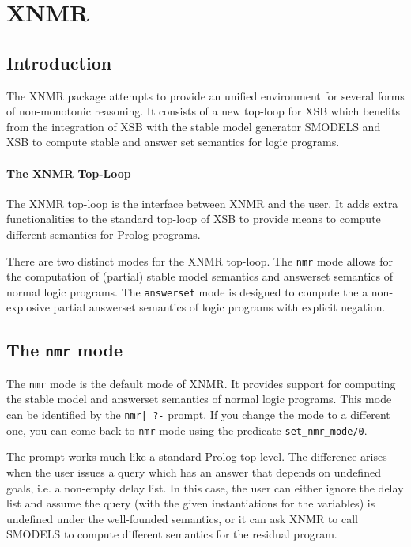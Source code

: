 
\section{XNMR}

\subsection{Introduction}

The XNMR package attempts to provide an unified environment for
several forms of non-monotonic reasoning. It consists of a new
top-loop for XSB which benefits from the integration of XSB with the
stable model generator SMODELS \cite{NiSi97} and XSB to compute
stable and answer set semantics for logic programs.

\paragraph*{The XNMR Top-Loop}

The XNMR top-loop is the interface between XNMR and the user. It adds
extra functionalities to the standard top-loop of XSB to provide means
to compute different semantics  for Prolog programs.

There are two distinct modes for the XNMR top-loop. The \texttt{nmr}
mode allows for the computation of (partial) stable model semantics
and answerset semantics of normal logic programs. The
\texttt{answerset} mode is designed to compute the a non-explosive
partial answerset semantics of logic programs with explicit negation.

\subsection{The \texttt{nmr} mode}

The \texttt{nmr} mode is the default mode of XNMR. It provides support
for computing the stable model and answerset semantics of normal logic
programs. This mode can be identified by the \verb#nmr| ?-# prompt. If
you change the mode to a different one, you can come back to
\texttt{nmr} mode using the predicate \texttt{set\_nmr\_mode/0}.

The prompt works much like a standard Prolog top-level. The difference
arises when the user issues a query which has an answer that depends
on undefined goals, i.e. a non-empty delay list. In this case, the
user can either ignore the delay list and assume the query (with the
given instantiations for the variables) is undefined under the
well-founded semantics, or it can ask XNMR to call SMODELS to compute
different semantics for the residual program.

